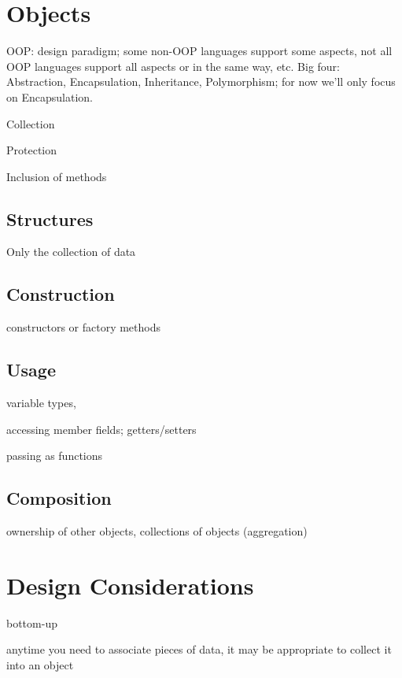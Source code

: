 \section{Objects}

OOP: design paradigm; some non-OOP languages support some aspects, 
not all OOP languages support all aspects or in the same way, etc.
Big four: Abstraction, Encapsulation, Inheritance, Polymorphism; 
for now we'll only focus on Encapsulation.

Collection

Protection

Inclusion of methods

\subsection{Structures}

Only the collection of data

\subsection{Construction}

constructors or factory methods

\subsection{Usage}

variable types, 

accessing member fields; getters/setters 

passing as functions

\subsection{Composition}

ownership of other objects, collections of objects (aggregation) 

\section{Design Considerations}

bottom-up

anytime you need to associate pieces of data, it may be appropriate to 
collect it into an object



